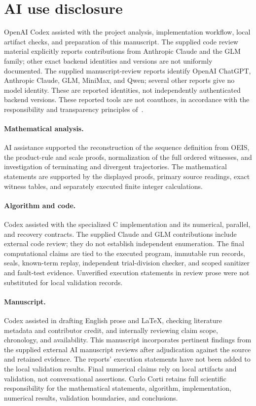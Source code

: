 \documentclass[11pt,a4paper]{article}
\theoremstyle{definition}
\theoremstyle{remark}
\begin{document}
\section*{AI use disclosure}
OpenAI Codex assisted with the project analysis, implementation workflow,
local artifact checks, and preparation of this manuscript. The supplied code
review material explicitly reports contributions from Anthropic Claude and
the GLM family; other exact backend identities and versions are not uniformly
documented. The supplied manuscript-review reports identify OpenAI ChatGPT,
Anthropic Claude, GLM, MiniMax, and Qwen; several other reports give no
model identity. These are reported identities, not independently
authenticated backend versions. These reported tools are not coauthors, in accordance with the
responsibility and transparency principles of~\cite{cope}.

\paragraph{Mathematical analysis.}
AI assistance supported the reconstruction of the sequence definition from
OEIS, the product-rule and scale proofs, normalization of the full ordered
witnesses, and investigation of terminating and divergent trajectories.
The mathematical statements are supported by the displayed proofs, primary
source readings, exact witness tables, and separately executed finite
integer calculations.

\paragraph{Algorithm and code.}
Codex assisted with the specialized C implementation and its numerical,
parallel, and recovery contracts. The supplied Claude and GLM contributions
include external code review; they do not establish independent enumeration.
The final computational claims are tied to the executed program, immutable
run records, seals, known-term replay, independent trial-division checker,
and scoped sanitizer and fault-test evidence. Unverified execution statements
in review prose were not substituted for local validation records.

\paragraph{Manuscript.}
Codex assisted in drafting English prose and LaTeX, checking literature
metadata and contributor credit, and internally reviewing claim scope,
chronology, and availability. This manuscript incorporates pertinent findings from the supplied external
AI manuscript reviews after adjudication against the source and retained
evidence. The reports' execution statements have not been added to the
local validation results. Final numerical claims rely on local artifacts
and validation, not conversational assertions. Carlo Corti retains full
scientific responsibility for the mathematical statements, algorithm,
implementation, numerical results, validation boundaries, and conclusions.
\end{document}
